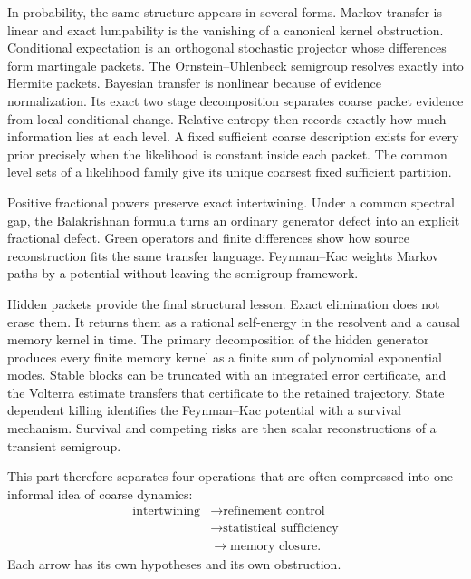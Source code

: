 \documentclass[11pt,letterpaper]{article}
\theoremstyle{plain}
\theoremstyle{plain}
\theoremstyle{plain}
\theoremstyle{definition}
\theoremstyle{definition}
\theoremstyle{definition}
\theoremstyle{definition}
\theoremstyle{definition}
\theoremstyle{remark}
\theoremstyle{remark}
\theoremstyle{remark}
\theoremstyle{remark}
\theoremstyle{remark}
\theoremstyle{remark}
\begin{document}
In probability, the same structure appears in several forms. Markov transfer is linear and exact lumpability is the vanishing of a canonical kernel obstruction. Conditional expectation is an orthogonal stochastic projector whose differences form martingale packets. The Ornstein--Uhlenbeck semigroup resolves exactly into Hermite packets. Bayesian transfer is nonlinear because of evidence normalization. Its exact two stage decomposition separates coarse packet evidence from local conditional change. Relative entropy then records exactly how much information lies at each level. A fixed sufficient coarse description exists for every prior precisely when the likelihood is constant inside each packet. The common level sets of a likelihood family give its unique coarsest fixed sufficient partition.

Positive fractional powers preserve exact intertwining. Under a common spectral gap, the Balakrishnan formula turns an ordinary generator defect into an explicit fractional defect. Green operators and finite differences show how source reconstruction fits the same transfer language. Feynman--Kac weights Markov paths by a potential without leaving the semigroup framework.

Hidden packets provide the final structural lesson. Exact elimination does not erase them. It returns them as a rational self-energy in the resolvent and a causal memory kernel in time. The primary decomposition of the hidden generator produces every finite memory kernel as a finite sum of polynomial exponential modes. Stable blocks can be truncated with an integrated error certificate, and the Volterra estimate transfers that certificate to the retained trajectory. State dependent killing identifies the Feynman--Kac potential with a survival mechanism. Survival and competing risks are then scalar reconstructions of a transient semigroup.

This part therefore separates four operations that are often compressed into one informal idea of coarse dynamics:
\[
\begin{aligned}
\text{intertwining}
&\longrightarrow
\text{refinement control}\\
&\longrightarrow
\text{statistical sufficiency}\\
&\longrightarrow
\text{memory closure}.
\end{aligned}
\]
Each arrow has its own hypotheses and its own obstruction.





\clearpage
\end{document}
